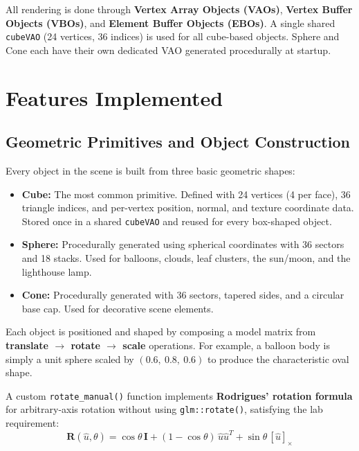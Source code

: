 \documentclass[12pt,a4paper]{article}
\begin{document}
All rendering is done through \textbf{Vertex Array Objects (VAOs)}, \textbf{Vertex Buffer Objects (VBOs)}, and \textbf{Element Buffer Objects (EBOs)}. A single shared \texttt{cubeVAO} (24 vertices, 36 indices) is used for all cube-based objects. Sphere and Cone each have their own dedicated VAO generated procedurally at startup.

\newpage
\section{Features Implemented}

\subsection{Geometric Primitives and Object Construction}

Every object in the scene is built from three basic geometric shapes:

\begin{itemize}[noitemsep]
    \item \textbf{Cube:} The most common primitive. Defined with 24 vertices (4 per face), 36 triangle indices, and per-vertex position, normal, and texture coordinate data. Stored once in a shared \texttt{cubeVAO} and reused for every box-shaped object.
    \item \textbf{Sphere:} Procedurally generated using spherical coordinates with 36 sectors and 18 stacks. Used for balloons, clouds, leaf clusters, the sun/moon, and the lighthouse lamp.
    \item \textbf{Cone:} Procedurally generated with 36 sectors, tapered sides, and a circular base cap. Used for decorative scene elements.
\end{itemize}

Each object is positioned and shaped by composing a model matrix from \textbf{translate $\rightarrow$ rotate $\rightarrow$ scale} operations. For example, a balloon body is simply a unit sphere scaled by $(0.6,\ 0.8,\ 0.6)$ to produce the characteristic oval shape.

A custom \texttt{rotate\_manual()} function implements \textbf{Rodrigues' rotation formula} for arbitrary-axis rotation without using \texttt{glm::rotate()}, satisfying the lab requirement:
\begin{equation}
    \mathbf{R}(\hat{u}, \theta) = \cos\theta\,\mathbf{I} + (1-\cos\theta)\,\hat{u}\hat{u}^T + \sin\theta\,[\hat{u}]_\times
\end{equation}
\end{document}
